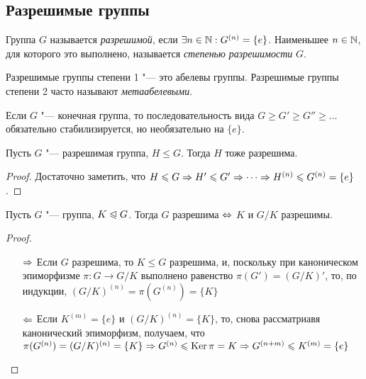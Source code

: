 \subsection{Разрешимые группы}

\begin{definition}
	Группа $G$ называется \textit{разрешимой}, если $\exists n \in \mathbb{N}: G^{(n)} = \{e\}$. Наименьшее $n \in \mathbb{N}$, для которого это выполнено, называется \textit{степенью разрешимости} $G$.
\end{definition}

\begin{note}
	Разрешимые группы степени 1 "--- это абелевы группы. Разрешимые группы степени 2 часто называют \textit{метаабелевыми}.
\end{note}

\begin{note}
	Если $G$ "--- конечная группа, то последовательность вида $G \ge G' \ge G'' \ge \ldots$ обязательно стабилизируется, но необязательно на $\{e\}$.
\end{note}

\begin{proposition}
	Пусть $G$ "--- разрешимая группа, $H \le G$. Тогда $H$ тоже разрешима.
\end{proposition}

\begin{proof}
	Достаточно заметить, что $H \leqslant G \Rightarrow H' \leqslant G' \Rightarrow \dotsb \Rightarrow H^{(n)} \leqslant G^{(n)} = \{e\}$.
\end{proof}

\begin{theorem}
	Пусть $G$ "--- группа, $K \trianglelefteqslant G$. Тогда $G$ разрешима $\Leftrightarrow$ $K$ и $G / K$ разрешимы.
\end{theorem}

\begin{proof}~
	\begin{itemize}
		\item[$\Rightarrow$] Если $G$ разрешима, то $K \le G$ разрешима, и, поскольку при каноническом эпиморфизме $\pi \colon G \to G/K$ выполнено равенство $\pi(G') = (G / K)'$, то, по индукции, $(G / K)^{(n)} = \pi(G^{(n)}) = \{K\}$
		\item[$\Leftarrow$] Если $K^{(m)} = \{e\}$ и $(G / K)^{(n)} = \{K\}$, то, снова рассматриавя канонический эпиморфизм, получаем, что $\pi(G^{(n)}) = (G / K)^{(n)} = \{K\} \Rightarrow G^{(n)} \leqslant \operatorname{Ker}\pi = K \Rightarrow G^{(n + m)} \leqslant K^{(m)} = \{e\}$
	\end{itemize}
\end{proof}

